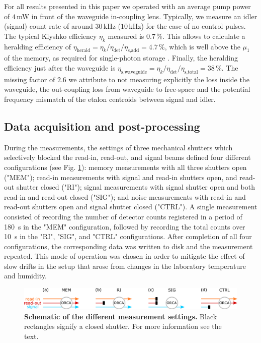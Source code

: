 For all results presented in this paper we operated with an average pump power of $4\,$mW in front of the waveguide in-coupling lens. Typically, we measure an idler (signal) count rate of around $30\,$kHz ($10\,$kHz) for the case of no control pulses. The typical Klyshko efficiency $\eta_k$ measured is $0.7\,\%$. This allows to calculate a heralding efficiency of $\eta_\textrm{herald} = \eta_k/\eta_{\textrm{det}}/\eta_\textrm{s,add} = 4.7\,\%$, which is well above the $\mu_1$ of the memory, as required for single-photon storage \cite{Gundogan2015}. Finally, the heralding efficiency just after the waveguide is $\eta_\textrm{s,waveguide} = \eta_k/\eta_{\textrm{det}}/\eta_\textrm{s,total} = 38\,\%$. The missing factor of $2.6$ we attribute to not measuring explicitly the loss inside the waveguide, the out-coupling loss from waveguide to free-space and the potential frequency mismatch of the etalon centroids between signal and idler.

\subsection{Data acquisition and post-processing}
During the measurements, the settings of three mechanical shutters which selectively blocked the read-in, read-out, and signal beams defined four different configurations (see Fig. \ref{fig:measurement_settings}): memory measurements with all three shutters open ("MEM"); read-in measurements with signal and read-in shutters open, and read-out shutter closed ("RI"); signal measurements with signal shutter open and both read-in and read-out closed ("SIG"); and noise measurements with read-in and read-out shutters open and signal shutter closed ("CTRL"). A single measurement consisted of recording the number of detector counts registered in a period of 180~s in the "MEM" configuration, followed by recording the total counts over 10~s in the "RI", "SIG", and "CTRL" configurations. After completion of all four configurations, the corresponding data was written to disk and the measurement repeated. This mode of operation was chosen in order to mitigate the effect of slow drifts in the setup that arose from changes in the laboratory temperature and humidity.

\begin{figure}[h!]
\centering
\includegraphics[width=\linewidth]{Sup1KTK.pdf}
\caption{\textbf{Schematic of the different measurement settings.} Black rectangles signify a closed shutter. For more information see the text.}
\label{fig:measurement_settings}
\end{figure}

